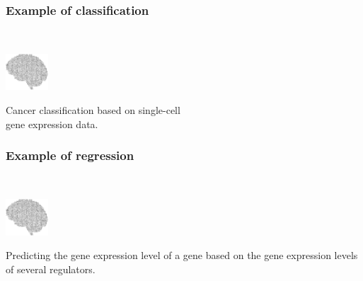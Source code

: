 \documentclass[aspectratio=169]{beamer}
\begin{document}
\begin{frame}
  \frametitle{Example of classification}
  \begin{block}{}
    \vspace{0.5cm}
    \ \ \ \
    \begin{minipage}{0.10\textwidth}
      \begin{center}
        \includegraphics[width=1.6cm]{images/publicdomainvectors_Random-Alphabet-Brain.pdf}
      \end{center}        
    \end{minipage}
    \hfill
    \begin{minipage}{0.80\textwidth}

     \begin{center}
       Cancer classification based on single-cell\\
       gene expression data.
     \end{center}

    \end{minipage}
    \vspace{0.3cm}
  \end{block}
\end{frame}


\begin{frame}
  \frametitle{Example of regression}
  \begin{block}{}
    \vspace{0.5cm}
    \ \ \ \
    \begin{minipage}{0.10\textwidth}
      \begin{center}
        \includegraphics[width=1.6cm]{images/publicdomainvectors_Random-Alphabet-Brain.pdf}
      \end{center}        
    \end{minipage}
    \hfill
    \begin{minipage}{0.80\textwidth}

     \begin{center}
       Predicting the gene expression level of a gene based on the
       gene expression levels of several regulators.
     \end{center}

    \end{minipage}
    \vspace{0.3cm}
  \end{block}
\end{frame}
\end{document}
